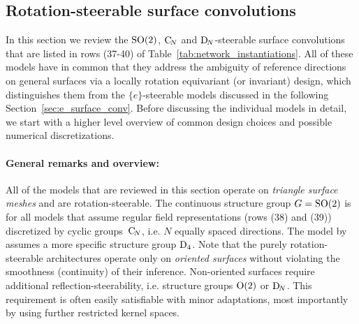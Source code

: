 

\subsection{Rotation-steerable surface convolutions}
\label{sec:so2_surface_conv}

In this section we review the $\operatorname{SO}(2)$, $\operatorname{C}_{\!N}$ and $\operatorname{D}_{\!N}$-steerable surface convolutions that are listed in  rows (37-40) of Table~\ref{tab:network_instantiations}.
All of these models have in common that they address the ambiguity of reference directions on general surfaces via a locally rotation equivariant (or invariant) design, which distinguishes them from the $\{e\}$-steerable models discussed in the following Section~\ref{sec:e_surface_conv}.
Before discussing the individual models in detail, we start with a higher level overview of common design choices and possible numerical discretizations.


\paragraph{General remarks and overview:}
All of the models that are reviewed in this section operate on \emph{triangle surface meshes} and are rotation-steerable.
The continuous structure group $G=\operatorname{SO}(2)$ is for all models that assume regular field representations (rows (38) and (39)) discretized by cyclic groups~$\operatorname{C}_{\!N}$, i.e. $N$ equally spaced directions.
The model by \citet{huang2019texturenet} assumes a more specific structure group $\operatorname{D}_{4}$.
Note that the purely rotation-steerable architectures operate only on \emph{oriented surfaces} without violating the smoothness (continuity) of their inference.
Non-oriented surfaces require additional reflection-steerability, i.e. structure groups $\operatorname{O}(2)$ or $\operatorname{D}_{\!N}$.
This requirement is often easily satisfiable with minor adaptations, most importantly by using further restricted kernel spaces.


